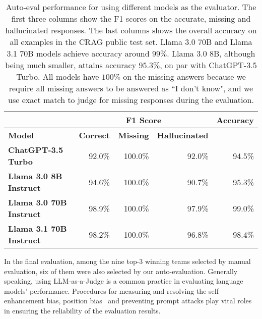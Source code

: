 \begin{table}[htbp]
\centering
\begin{tabular}{lrrrr}
\toprule
                       & \multicolumn{3}{c}{\textbf{F1 Score}}                    & \textbf{Accuracy}    \\
\midrule
\textbf{Model}               & \textbf{Correct} & \textbf{Missing} & \textbf{Hallucinated} & \multicolumn{1}{l}{} \\
\midrule
\textbf{ChatGPT-3.5 Turbo}   & 92.0\%          & 100.0\%            & 92.0\%            & 94.5\%              \\
\textbf{Llama 3.0 8B Instruct}  & 94.6\%          & 100.0\%            & 90.7\%            & 95.3\%              \\
\textbf{Llama 3.0 70B Instruct} & 98.9\%          & 100.0\%            & 97.9\%            & 99.0\%              \\
\textbf{Llama 3.1 70B Instruct} & 98.2\%          & 100.0\%            & 96.8\%            & 98.4\%              \\
\bottomrule
\end{tabular}
\caption{Auto-eval performance for using different models as the evaluator. The first three columns show the F1 scores on the accurate, missing and hallucinated responses. The last columns shows the overall accuracy on all examples in the CRAG public test set. Llama 3.0 70B and Llama 3.1 70B models achieve accuracy around $99\%$. Llama 3.0 8B, although being much smaller, attains accuracy $95.3\%$, on par with ChatGPT-3.5 Turbo. All models have $100\%$ on the missing answers because we require all missing answers to be answered as ``I don't know", and we use exact match to judge for missing responses during the evaluation.}
\label{tab:auto_eval_accuracy}
\end{table}

In the final evaluation, among the nine top-3 winning teams selected by manual evaluation, six of them were also selected by our auto-evaluation. Generally speaking, using LLM-as-a-Judge is a common practice in evaluating language models' performance. Procedures for measuring and resolving the self-enhancement bias, position bias~\cite{zheng2023judging} and preventing prompt attacks play vital roles in ensuring the reliability of the evaluation results.


